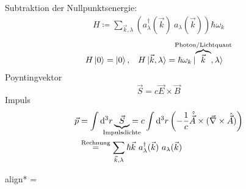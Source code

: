 	Subtraktion der Nullpunktsenergie:
		\begin{align*}
			\boxed{ 
				H \coloneqq 
				\sum_{\vec{k}, \lambda} \left( a^\dagger_\lambda (\vec{k}) ~a_\lambda (\vec{k})\right)
				\hbar \omega_k
			}
		\end{align*}
		\begin{align*}
			H \ket{0} &= \ket{0} ,& 
			H\ket{\vec{k}, \lambda} &= 
			\hbar \omega_k \ket{\overbrace{\vec{k}}^{\mathclap{\text{Photon/Lichtquant}}} , \lambda}
		\end{align*}
	Poyntingvektor
		\begin{equation*}
			\vec{S} = c \vec{E} \times \vec{B}
		\end{equation*}
	Impuls
		\begin{align*}
			\vec{p} &= \int \diff^3 r \underbrace{\vec{S}}_{\mathclap{\text{Impulsdichte}}} 
			= c \int \diff^3 r 
			\left( - \frac{1}{c} \hat{\dot{\vec{A}}} \times (\vec{\nabla} \times \hat{\vec{A}})
			\right) \\
			&\overset{\text{Rechnung}}{=} 
			\sum_{\vec{k} , \lambda} \hbar \vec{k} ~a^\dagger_\lambda (\vec{k}) ~a_\lambda (\vec{k})
		\end{align*}
		\begin{empheq}[box=\boxed]{align*}
			  = \hbar \vec{k} \ket{ , \lambda}
		\end{empheq}